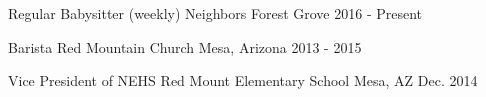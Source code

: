 \begin{cventries}
  \cventry
    {Regular Babysitter (weekly)} %
    {Neighbors} %
    {Forest Grove} %
    {2016 - Present} %
    {
    }

  \cventry
    {Barista} %
    {Red Mountain Church} %
    {Mesa, Arizona} %
    {2013 - 2015} %
    {
    }

  \cventry
    {Vice President of NEHS} %
    {Red Mount Elementary School} %
    {Mesa, AZ} %
    {Dec. 2014} %
    {
    }


\end{cventries}
